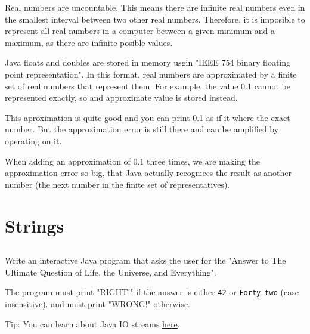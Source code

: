 \documentclass[a4paper, 11pt]{article}
\begin{document}
\begin{solution}
Real numbers are uncountable.  This means there are infinite real numbers even
in the smallest interval between two other real numbers. Therefore, it is
imposible to represent all real numbers in a computer between a given minimum
and a maximum, as there are infinite posible values.

Java floats and doubles are stored in memory usgin "IEEE 754 binary floating
point representation".  In this format, real numbers are approximated by a
finite set of real numbers that represent them.  For example, the value 0.1
cannot be represented exactly, so and approximate value is stored instead.

This aproximation is quite good and you can print 0.1 as if it where the exact
number.  But the approximation error is still there and can be amplified by
operating on it.

When adding an approximation of 0.1 three times, we are making the
approximation error so big, that Java actually recognices the result as another
number (the next number in the finite set of representatives).
\end{solution}

\section{Strings}

\subsection{}

Write an interactive Java program that asks the user for the
"Answer to The Ultimate Question of Life, the Universe, and Everything".

The program must print "RIGHT!" if the answer is either
\texttt{42} or \texttt{Forty-two} (case insensitive).
and must print "WRONG!" otherwise.

Tip: You can learn about Java IO streams
\href{https://docs.oracle.com/javase/tutorial/essential/io/streams.html}{here}.


\subsection{}
\end{document}
